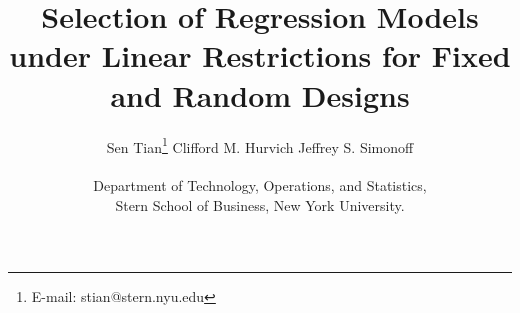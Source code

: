 \documentclass{article}
\begin{document}
\def\spacingset#1{\renewcommand{\baselinestretch}%
{#1}\small\normalsize} \spacingset{1}


\title{\bf Selection of Regression Models under Linear Restrictions for Fixed and Random Designs}
\author{Sen Tian\footnote{E-mail: stian@stern.nyu.edu} \quad Clifford M. Hurvich  \quad Jeffrey S. Simonoff \\\\
  Department of Technology, Operations, and Statistics, \\Stern School of Business, New York University.}
\date{}
\maketitle








\clearpage

%




\end{document}
